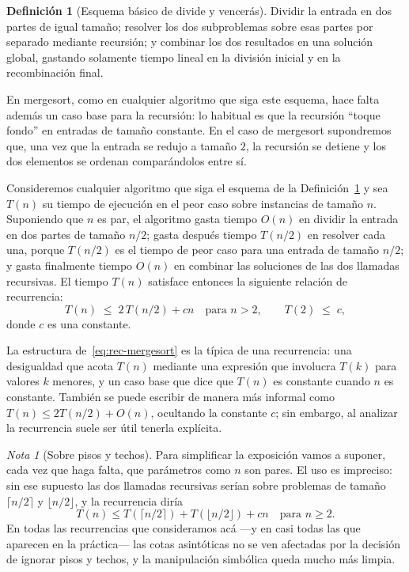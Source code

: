 \documentclass[12pt, spanish, oneside, openany]{book}
\theoremstyle{uprightplain}
\theoremstyle{definition}
\newtheorem{definicion}[teorema]{Definición}
\theoremstyle{remark}
\newtheorem{nota}[teorema]{Nota}
\theoremstyle{definition}
\begin{document}
\begin{definicion}[Esquema básico de divide y vencerás]
\label{def:esquema-dv}
Dividir la entrada en dos partes de igual tamaño; resolver los dos subproblemas sobre esas partes por separado mediante recursión; y combinar los dos resultados en una solución global, gastando solamente tiempo lineal en la división inicial y en la recombinación final.
\end{definicion}

En mergesort, como en cualquier algoritmo que siga este esquema, hace falta además un caso base para la recursión: lo habitual es que la recursión ``toque fondo'' en entradas de tamaño constante. En el caso de mergesort supondremos que, una vez que la entrada se redujo a tamaño $2$, la recursión se detiene y los dos elementos se ordenan comparándolos entre sí.

Consideremos cualquier algoritmo que siga el esquema de la Definición~\ref{def:esquema-dv} y sea $T(n)$ su tiempo de ejecución en el peor caso sobre instancias de tamaño $n$. Suponiendo que $n$ es par, el algoritmo gasta tiempo $O(n)$ en dividir la entrada en dos partes de tamaño $n/2$; gasta después tiempo $T(n/2)$ en resolver cada una, porque $T(n/2)$ es el tiempo de peor caso para una entrada de tamaño $n/2$; y gasta finalmente tiempo $O(n)$ en combinar las soluciones de las dos llamadas recursivas. El tiempo $T(n)$ satisface entonces la siguiente relación de recurrencia:
\begin{equation}
\label{eq:rec-mergesort}
T(n) \;\le\; 2\,T(n/2) + cn \quad \text{para } n>2, \qquad T(2) \;\le\; c,
\end{equation}
donde $c$ es una constante.

La estructura de~\eqref{eq:rec-mergesort} es la típica de una recurrencia: una desigualdad que acota $T(n)$ mediante una expresión que involucra $T(k)$ para valores $k$ menores, y un caso base que dice que $T(n)$ es constante cuando $n$ es constante. También se puede escribir de manera más informal como $T(n)\le 2T(n/2)+O(n)$, ocultando la constante $c$; sin embargo, al analizar la recurrencia suele ser útil tenerla explícita.

\begin{nota}[Sobre pisos y techos]
\label{nota:pisos-techos}
Para simplificar la exposición vamos a suponer, cada vez que haga falta, que parámetros como $n$ son pares. El uso es impreciso: sin ese supuesto las dos llamadas recursivas serían sobre problemas de tamaño $\lceil n/2\rceil$ y $\lfloor n/2\rfloor$, y la recurrencia diría
\[
T(n) \le T(\lceil n/2\rceil) + T(\lfloor n/2\rfloor) + cn \quad \text{para } n\ge 2 .
\]
En todas las recurrencias que consideramos acá ---y en casi todas las que aparecen en la práctica--- las cotas asintóticas no se ven afectadas por la decisión de ignorar pisos y techos, y la manipulación simbólica queda mucho más limpia.
\end{nota}
\end{document}
